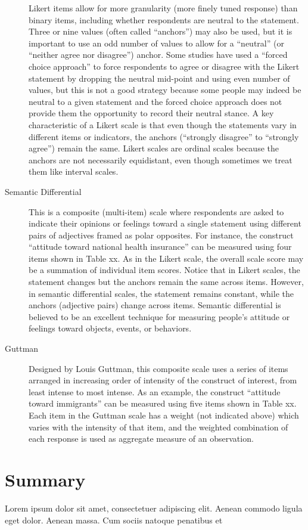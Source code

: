 \begin{description}
	
	Likert items allow for more granularity (more finely tuned response) than binary items, including whether respondents are neutral to the statement. Three or nine values (often called ``anchors'') may also be used, but it is important to use an odd number of values to allow for a ``neutral'' (or ``neither agree nor disagree'') anchor. Some studies have used a ``forced choice approach'' to force respondents to agree or disagree with the Likert statement by dropping the neutral mid-point and using even number of values, but this is not a good strategy because some people may indeed be neutral to a given statement and the forced choice approach does not provide them the opportunity to record their neutral stance. A key characteristic of a Likert scale is that even though the statements vary in different items or indicators, the anchors (``strongly disagree'' to ``strongly agree'') remain the same. Likert scales are ordinal scales because the anchors are not necessarily equidistant, even though sometimes we treat them like interval scales.
	
	\item[Semantic Differential] This is a composite (multi-item) scale where respondents are asked to indicate their opinions or feelings toward a single statement using different pairs of adjectives framed as polar opposites. For instance, the construct ``attitude toward national health insurance'' can be measured using four items shown in Table xx. As in the Likert scale, the overall scale score may be a summation of individual item scores. Notice that in Likert scales, the statement changes but the anchors remain the same across items. However, in semantic differential scales, the statement remains constant, while the anchors (adjective pairs) change across items. Semantic differential is believed to be an excellent technique for measuring people's attitude or feelings toward objects, events, or behaviors. 
	
	\item[Guttman] Designed by Louis Guttman, this composite scale uses a series of items arranged in increasing order of intensity of the construct of interest, from least intense to most intense. As an example, the construct ``attitude toward immigrants'' can be measured using five items shown in Table xx. Each item in the Guttman scale has a weight (not indicated above) which varies with the intensity of that item, and the weighted combination of each response is used as aggregate measure of an observation.
	
\end{description}









\section{Summary}\label{ch05:summary}

Lorem ipsum dolor sit amet, consectetuer adipiscing elit. Aenean commodo ligula eget dolor. Aenean massa. Cum sociis natoque penatibus et
